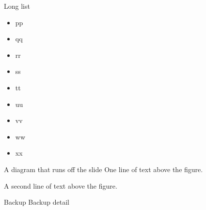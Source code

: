 \documentclass{beamer}
\begin{document}
\begin{frame}[allowframebreaks]{Long list}
\begin{itemize}
    \item pp \item qq \item rr \item ss \item tt \item uu \item vv \item ww
    \item xx
  \end{itemize}
\end{frame}

\begin{frame}[t]{A diagram that runs off the slide}
  One line of text above the figure.

  A second line of text above the figure.

\end{frame}


\appendix
\begin{frame}{Backup}
  Backup detail
\end{frame}
\end{document}
